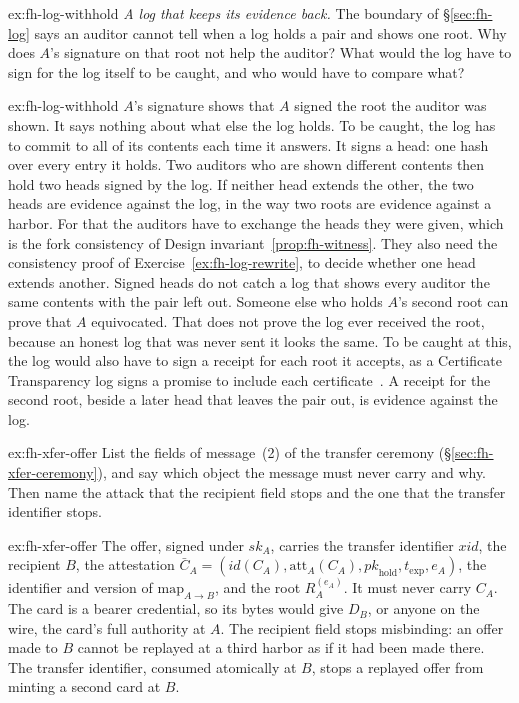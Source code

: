 \documentclass[11pt,a4paper]{article}
\theoremstyle{definition}
\theoremstyle{remark}
\begin{document}
\begin{pdexercise}[kind=Open,rating=3]{ex:fh-log-withhold}
\emph{A log that keeps its evidence back.} The boundary of
\S\ref{sec:fh-log} says an auditor cannot tell when a log holds a pair
and shows one root. Why does $A$'s signature on that root not help the
auditor? What would the log have to sign for the log itself to be caught,
and who would have to compare what?
\end{pdexercise}
\begin{pdsolution}{ex:fh-log-withhold}
$A$'s signature shows that $A$ signed the root the auditor was shown.
It says nothing about what else the log holds. To be caught, the log has
to commit to all of its contents each time it answers. It signs a head:
one hash over every entry it holds. Two auditors who are shown different
contents then hold two heads signed by the log. If neither head extends
the other, the two heads are evidence against the log, in the way two
roots are evidence against a harbor. For that the auditors have to
exchange the heads they were given, which is the fork consistency of
Design invariant~\ref{prop:fh-witness}. They also need the consistency
proof of Exercise~\ref{ex:fh-log-rewrite}, to decide whether one head
extends another. Signed heads do not catch a log that shows every auditor
the same contents with the pair left out. Someone else who holds $A$'s
second root can prove that $A$ equivocated. That does not prove the log
ever received the root, because an honest log that was never sent it
looks the same. To be caught at this, the log would also have to sign a
receipt for each root it accepts, as a Certificate Transparency log signs
a promise to include each certificate~. A receipt for
the second root, beside a later head that leaves the pair out, is
evidence against the log.
\end{pdsolution}


\begin{pdexercise}[kind=Check,rating=1]{ex:fh-xfer-offer}
List the fields of message~(2) of the transfer ceremony (\S\ref{sec:fh-xfer-ceremony}), and say which object the message must never carry and why. Then name the attack that the recipient field stops and the one that the transfer identifier stops.
\end{pdexercise}
\begin{pdsolution}{ex:fh-xfer-offer}
The offer, signed under $\mathit{sk}_A$, carries the transfer identifier $\mathit{xid}$, the recipient $B$, the attestation $\bar{C}_A=(\mathit{id}(C_A),\mathrm{att}_A(C_A),\mathit{pk}_{\mathrm{hold}},t_{\mathrm{exp}},e_A)$, the identifier and version of $\mathrm{map}_{A\to B}$, and the root $R_A^{(e_A)}$. It must never carry $C_A$. The card is a bearer credential, so its bytes would give $D_B$, or anyone on the wire, the card's full authority at $A$. The recipient field stops misbinding: an offer made to $B$ cannot be replayed at a third harbor as if it had been made there. The transfer identifier, consumed atomically at $B$, stops a replayed offer from minting a second card at $B$.
\end{pdsolution}
\end{document}
